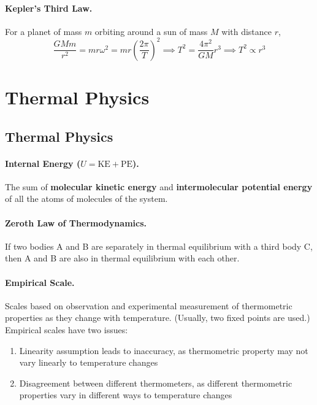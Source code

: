 \documentclass{article}
\begin{document}
\paragraph{Kepler's Third Law.} For a planet of mass $m$ orbiting around a sun
of mass $M$ with distance $r$, \begin{equation} \frac{GMm}{r^2} = mr\omega^2 =
  mr\left(\frac{2\pi}{T}\right)^2 \implies T^2 = \frac{4\pi^2}{GM}r^3 \implies
  T^2 \propto r^3 \end{equation}

\section{Thermal Physics}

\subsection{Thermal Physics}

\paragraph{Internal Energy ($U = \mathrm{KE} + \mathrm{PE}$).} The sum of
\textbf{molecular kinetic energy} and \textbf{intermolecular potential energy}
of all the atoms of molecules of the system.

\paragraph{Zeroth Law of Thermodynamics.} If two bodies A and B are separately
in thermal equilibrium with a third body C, then A and B are also in thermal
equilibrium with each other.

\paragraph{Empirical Scale.} Scales based on observation and experimental
measurement of thermometric properties as they change with temperature.
(Usually, two fixed points are used.) Empirical scales have two issues:
\begin{enumerate} \item Linearity assumption leads to inaccuracy, as
      thermometric property may not vary linearly to temperature changes \item
Disagreement between different thermometers, as different thermometric
properties vary in different ways to temperature changes \end{enumerate}
\end{document}
